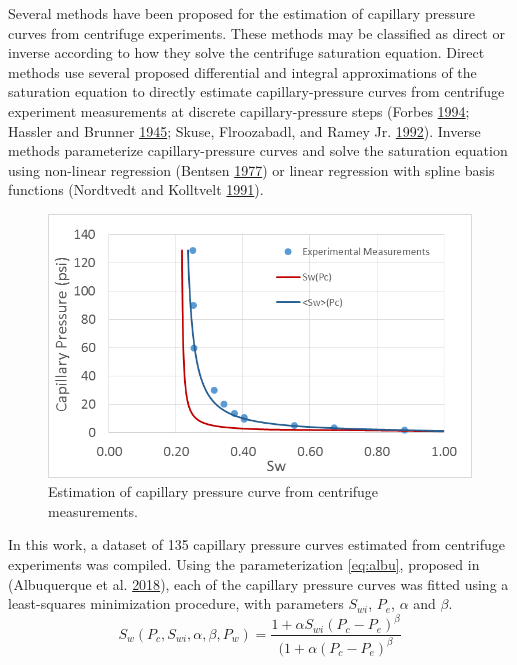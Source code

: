 \documentclass[english,msc,numbers]{coppe}
\begin{document}
  Several methods have been proposed for the estimation of capillary pressure curves from centrifuge experiments. These methods may be classified as direct or inverse according to how they solve the centrifuge saturation equation. Direct methods use several proposed differential and integral approximations of the saturation equation to directly estimate capillary-pressure curves from centrifuge experiment measurements at discrete capillary-pressure steps (Forbes \protect\hyperlink{ref-Forbes1994}{1994}; Hassler and Brunner \protect\hyperlink{ref-Hassler1945}{1945}; Skuse, Flroozabadl, and Ramey Jr. \protect\hyperlink{ref-Skuse1992}{1992}). Inverse methods parameterize capillary-pressure curves and solve the saturation equation using non-linear regression (Bentsen \protect\hyperlink{ref-Bentsen1977}{1977}) or linear regression with spline basis functions (Nordtvedt and Kolltvelt \protect\hyperlink{ref-Nordtvedt1991}{1991}).
  \begin{figure}
  
  {\centering \includegraphics[width=0.7\linewidth]{figure/2-8-centrifuge-experiment} 
  
  }
  
  \caption{Estimation of capillary pressure curve from centrifuge measurements.}\label{fig:centrifuge-experiment}
  \end{figure}
  In this work, a dataset of 135 capillary pressure curves estimated from centrifuge experiments was compiled. Using the parameterization \eqref{eq:albu}, proposed in (Albuquerque et al. \protect\hyperlink{ref-Albuquerque2018}{2018}), each of the capillary pressure curves was fitted using a least-squares minimization procedure, with parameters \(S_{wi}\), \(P_e\), \(\alpha\) and \(\beta\).
  \begin{equation} 
    S_w(P_c, S_{wi}, \alpha, \beta, P_w) = \frac{1+\alpha S_{wi}(P_c - P_e)^\beta}{(1+\alpha (P_c - P_e)^\beta}
    \label{eq:albu}
  \end{equation}
\end{document}
